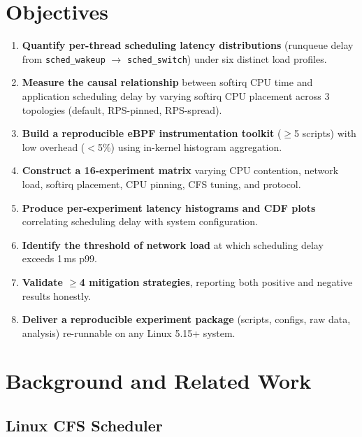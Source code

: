 \documentclass[11pt,a4paper]{article}
\begin{document}
\section{Objectives}
\label{sec:objectives}

\begin{enumerate}[leftmargin=*]
  \item \textbf{Quantify per-thread scheduling latency distributions} (runqueue delay from \texttt{sched\_wakeup} $\to$ \texttt{sched\_switch}) under six distinct load profiles.
  \item \textbf{Measure the causal relationship} between softirq CPU time and application scheduling delay by varying softirq CPU placement across 3 topologies (default, RPS-pinned, RPS-spread).
  \item \textbf{Build a reproducible eBPF instrumentation toolkit} ($\geq$5 scripts) with low overhead ($<$5\%) using in-kernel histogram aggregation.
  \item \textbf{Construct a 16-experiment matrix} varying CPU contention, network load, softirq placement, CPU pinning, CFS tuning, and protocol.
  \item \textbf{Produce per-experiment latency histograms and CDF plots} correlating scheduling delay with system configuration.
  \item \textbf{Identify the threshold of network load} at which scheduling delay exceeds 1\,ms p99.
  \item \textbf{Validate $\geq$4 mitigation strategies}, reporting both positive and negative results honestly.
  \item \textbf{Deliver a reproducible experiment package} (scripts, configs, raw data, analysis) re-runnable on any Linux 5.15+ system.
\end{enumerate}


\section{Background and Related Work}
\label{sec:background}

\subsection{Linux CFS Scheduler}
\end{document}
